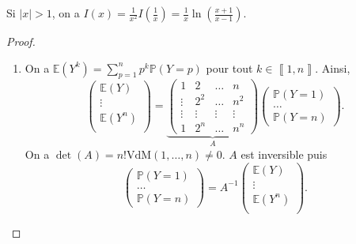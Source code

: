 \documentclass[12pt]{article}
\begin{document}
\begin{remark}
    Si $\left\lvert x\right\rvert>1$, on a $I(x)=\frac{1}{x^{2}}I\left(\frac{1}{x}\right)=\frac{1}{x}\ln\left(\frac{x+1}{x-1}\right)$.
\end{remark}

\begin{proof}
    \phantom{}
    \begin{enumerate}
        \item On a $\mathbb{E}(Y^{k})=\sum_{p=1}^{n}p^{k}\mathbb{P}\left(Y=p\right)$ pour tout $k\in\left\llbracket1,n\right\rrbracket$. Ainsi,
        \begin{equation}
            \begin{pmatrix}
                \mathbb{E}(Y)\\
                \vdots\\
                \mathbb{E}(Y^{n})\\
            \end{pmatrix}=
            \underbrace{
                \begin{pmatrix}
                    1&2&\dots&n\\
                    \vdots&2^{2}&\dots&n^{2}\\
                    \vdots & \vdots &\vdots & \vdots\\
                    1&2^{n}&\dots&n^{n}
                \end{pmatrix}
            }_{A}
            \begin{pmatrix}
                \mathbb{P}(Y=1)\\
                \dots\\
                \mathbb{P}(Y=n)
            \end{pmatrix}.
        \end{equation}
        On a $\det(A)=n! \text{VdM}(1,\dots,n)\neq0$. $A$ est inversible puis
        \begin{equation}
            \begin{pmatrix}
                \mathbb{P}(Y=1)\\
                \dots\\
                \mathbb{P}(Y=n)
            \end{pmatrix}=
            A^{-1}
            \begin{pmatrix}
                \mathbb{E}(Y)\\
                \vdots\\
                \mathbb{E}(Y^{n})\\
            \end{pmatrix}.
        \end{equation}


\end{enumerate}
\end{proof}
\end{document}
